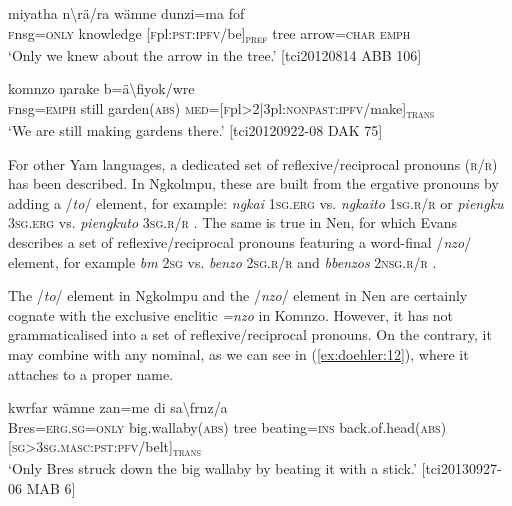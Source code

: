 \documentclass[output=paper]{langscibook}
\begin{document}
\ea
    \label{ex:doehler:10}
	 {miyatha} {n\textbackslash{rä}/ra} {wämne} {dunzi=ma} {fof}\\
	\textsc{f}nsg=\textsc{only}{} knowledge [\textsc{f}pl:\textsc{pst}:\textsc{ipfv}/be]\textsubscript{\textsc{pref}} tree arrow=\textsc{char}{} \textsc{emph}{}\\
	\glt `Only we knew about the arrow in the tree.'
	[tci20120814 ABB 106]

\z


\ea
\label{ex:doehler:11}
	 {komnzo} {ŋarake} {b=ä\textbackslash{fiyok}/wre}\\
	\textsc{f}nsg=\textsc{emph}{} still garden(\textsc{abs}) \textsc{med}=[\textsc{f}pl>2|3pl:\textsc{nonpast}:\textsc{ipfv}/make]\textsubscript{\textsc{trans}}\\
	\glt `We are still making gardens there.'
	[tci20120922-08 DAK 75]

\z


For other Yam languages, a dedicated set of reflexive/reciprocal pronouns (\textsc{r/r}) has been described. In Ngkolmpu, these are built from the ergative pronouns by adding a /\emph{to}/ element, for example: \emph{ngkai} 1\textsc{sg}.\textsc{erg} vs. \emph{ngkaito} 1\textsc{sg}.\textsc{r/r} or \emph{piengku} 3\textsc{sg}.\textsc{erg}{} vs. \emph{piengkuto} 3\textsc{sg}.\textsc{r/r} \citep[138]{Carroll2016}. The same is true in Nen, for which Evans describes a set of reflexive/reciprocal pronouns featuring a word-final /\emph{nzo}/ element, for example \emph{bm} \textsc{2sg}{} vs. \emph{benzo} \textsc{2sg}.\textsc{r/r} and \emph{bbenzos} 2\textsc{nsg}.\textsc{r/r} \citep[1091]{Evans2015Valency}.

The /\emph{to}/ element in Ngkolmpu and the /\emph{nzo}/ element in Nen are certainly cognate with the exclusive enclitic \emph{=nzo} in Komnzo. However, it has not grammaticalised into a set of reflexive/reciprocal pronouns. On the contrary, it may combine with any nominal, as we can see in (\ref{ex:doehler:12}), where it attaches to a proper name.


\ea
    \label{ex:doehler:12}
	 {kwrfar} {wämne} {zan=me} {di} {sa\textbackslash{frnz}/a}\\
	Bres=\textsc{erg}.\textsc{sg}=\textsc{only}{} big.wallaby(\textsc{abs}) tree beating=\textsc{ins}{} back.of.head(\textsc{abs}) [\textsc{sg}>3\textsc{sg}.\textsc{masc}:\textsc{pst}:\textsc{pfv}/belt]\textsubscript{\textsc{trans}}\\
	\glt `Only Bres struck down the big wallaby by beating it with a stick.' [tci20130927-06 MAB 6]
\z
	
\end{document}
